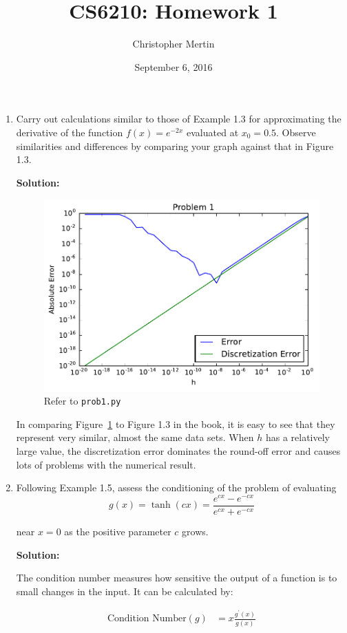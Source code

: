 \documentclass[12pt]{article}
\begin{document}
\title{CS6210: Homework 1}
\author{Christopher Mertin}
\date{September 6, 2016}
\maketitle

\begin{enumerate}
\item Carry out calculations similar to those of Example 1.3 for approximating
the derivative of the function $f(x)=e^{-2x}$ evaluated at $x_{0}=0.5$. Observe
similarities and differences by comparing your graph against that in Figure 1.3.

{\bf Solution:}

\begin{figure}[H]
  \centering
  \includegraphics[width=.5\textwidth]{./hw1_prob1.pdf}
  \caption{Refer to {\tt prob1.py}}
  \label{fig:prob1}
\end{figure}

In comparing Figure~\ref{fig:prob1} to Figure 1.3 in the book, it is easy to see
that they represent very similar, almost the same data sets. When $h$ has a relatively
large value, the discretization error dominates the round-off error and causes lots
of problems with the numerical result.

\item Following Example 1.5, assess the conditioning of the problem of evaluating
\[
  g(x)=\tanh{(cx)} = \frac{e^{cx}-e^{-cx}}{e^{cx}+e^{-cx}}
\]

near $x=0$ as the positive parameter $c$ grows.

{\bf Solution:}

The condition number measures how sensitive the output of a function is to small
changes in the input. It can be calculated by:

\begin{align*}
\text{Condition Number}(g) &= x\frac{g^{\prime}(x)}{g(x)}
\end{align*}


\end{enumerate}
\end{document}
